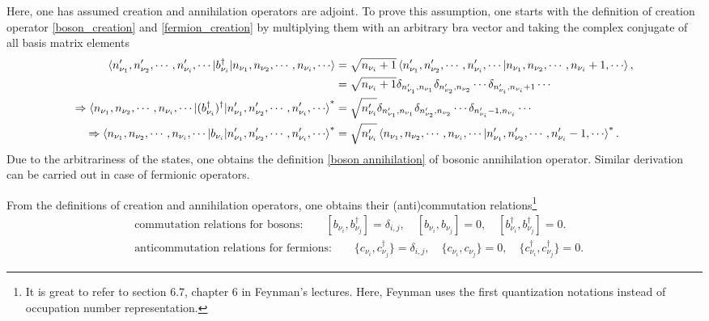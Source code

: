 \documentclass[a4paper,12pts]{article}
\numberwithin{equation}{section}
\begin{document}
	Here, one has assumed creation and annihilation operators are adjoint. To prove this assumption, one starts with the definition of creation operator \ref{boson_creation} and \ref{fermion_creation} by multiplying them with an arbitrary bra vector and taking the complex conjugate of all basis matrix elements
	\begin{align}
	\braket{n_{\nu_1}', n_{\nu_2}',\cdots, n_{\nu_i}',\cdots|b^{\dagger}_{\nu_i}|n_{\nu_1}, n_{\nu_2},\cdots, n_{\nu_i},\cdots} &= \sqrt{n_{\nu_i}+1}\braket{n_{\nu_1}', n_{\nu_2}',\cdots, n_{\nu_i}',\cdots|n_{\nu_1}, n_{\nu_2},\cdots, n_{\nu_i}+1,\cdots}, \nonumber\\
	&= \sqrt{n_{\nu_i}+1}\delta_{n_{\nu_1}',n_{\nu_1}}\delta_{n_{\nu_2}',n_{\nu_2}}\cdots\delta_{n_{\nu_i}',n_{\nu_i}+1}\cdots \nonumber\\
	\Rightarrow  \braket{n_{\nu_1}, n_{\nu_2},\cdots, n_{\nu_i},\cdots|(b^{\dagger}_{\nu_i})^{\dagger}|n_{\nu_1}', n_{\nu_2}',\cdots, n_{\nu_i}',\cdots}^* &= \sqrt{n_{\nu_i}'}\delta_{n_{\nu_1}',n_{\nu_1}}\delta_{n_{\nu_2}',n_{\nu_2}}\cdots\delta_{n_{\nu_i}'-1,n_{\nu_i}}\cdots\nonumber\\
	\Rightarrow \braket{n_{\nu_1}, n_{\nu_2},\cdots, n_{\nu_i},\cdots|b_{\nu_i}|n_{\nu_1}', n_{\nu_2}',\cdots, n_{\nu_i}',\cdots}^* &= \sqrt{n_{\nu_i}'}\braket{n_{\nu_1}, n_{\nu_2},\cdots, n_{\nu_i},\cdots|n_{\nu_1}', n_{\nu_2}',\cdots, n_{\nu_i}'-1,\cdots}^*.
	\end{align}
	Due to the arbitrariness of the states, one obtains the definition \ref{boson annihilation} of bosonic annihilation operator. Similar derivation can be carried out in case of fermionic operators.
	
	From the definitions of creation and annihilation operators, one obtains their (anti)commutation relations\footnote{It is great to refer to section 6.7, chapter 6 in Feynman's lectures. Here, Feynman uses the first quantization notations instead of occupation number representation.}
	\begin{align}
	&\text{commutation relations for bosons:}\qquad [b_{\nu_i},b^{\dagger}_{\nu_j}] = \delta_{i,j}, \quad [b_{\nu_i},b_{\nu_j}] = 0, \quad [b^{\dagger}_{\nu_i},b^{\dagger}_{\nu_j}] = 0.\\
	&\text{anticommutation relations for fermions:}\qquad \{c_{\nu_i},c^{\dagger}_{\nu_j}\} = \delta_{i,j}, \quad \{c_{\nu_i},c_{\nu_j}\} = 0, \quad \{c^{\dagger}_{\nu_i},c^{\dagger}_{\nu_j}\} = 0.
	\end{align}
	
\end{document}
